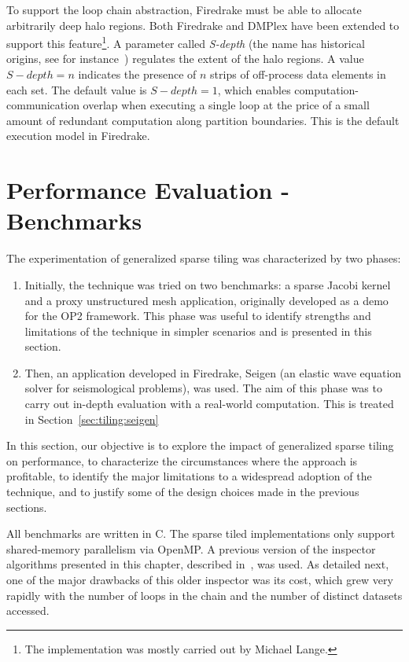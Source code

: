 To support the loop chain abstraction, Firedrake must be able to allocate arbitrarily deep halo regions. Both Firedrake and DMPlex have been extended to support this feature\footnote{The implementation was mostly carried out by Michael Lange.}. A parameter called {\em S-depth} (the name has historical origins, see for instance~\cite{s-depth-paper}) regulates the extent of the halo regions. A value $S{-}depth=n$ indicates the presence of $n$ strips of off-process data elements in each set. The default value is $S{-}depth=1$, which enables computation-communication overlap when executing a single loop at the price of a small amount of redundant computation along partition boundaries. This is the default execution model in Firedrake.


\section{Performance Evaluation - Benchmarks}
\label{sec:tiling:benchmarks}
The experimentation of generalized sparse tiling was characterized by two phases:

\begin{enumerate}
\item Initially, the technique was tried on two benchmarks: a sparse Jacobi kernel and a proxy unstructured mesh application, originally developed as a demo for the OP2 framework. This phase was useful to identify strengths and limitations of the technique in simpler scenarios and is presented in this section.
\item Then, an application developed in Firedrake, Seigen (an elastic wave equation solver for seismological problems), was used. The aim of this phase was to carry out in-depth evaluation with a real-world computation. This is treated in Section~\ref{sec:tiling:seigen}
\end{enumerate}

In this section, our objective is to explore the impact of generalized sparse tiling on performance, to characterize the circumstances where the approach is profitable, to identify the major limitations to a widespread adoption of the technique, and to justify some of the design choices made in the previous sections.

All benchmarks are written in C. The sparse tiled implementations only support shared-memory parallelism via OpenMP. A previous version of the inspector algorithms presented in this chapter, described in~\cite{st-paper}, was used. As detailed next, one of the major drawbacks of this older inspector was its cost, which grew very rapidly with the number of loops in the chain and the number of distinct datasets accessed. 

